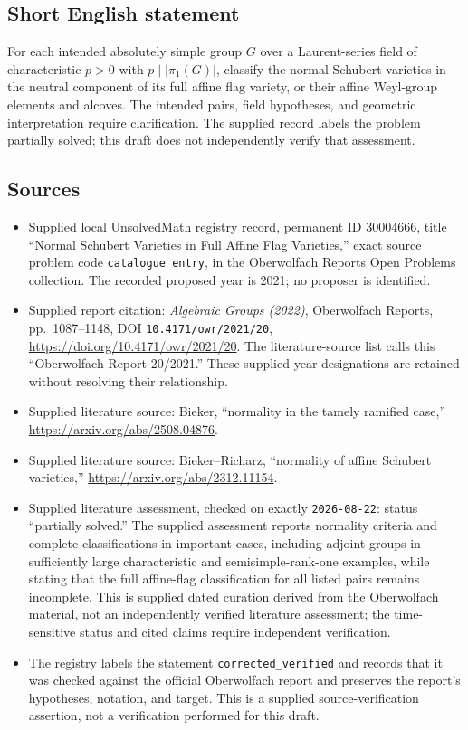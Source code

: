 \documentclass[11pt]{article}
\begin{document}
\subsection{Short English statement}
For each intended absolutely simple group \(G\) over a Laurent-series field of characteristic \(p>0\) with \(p\mid|\pi_1(G)|\), classify the normal Schubert varieties in the neutral component of its full affine flag variety, or their affine Weyl-group elements and alcoves. The intended pairs, field hypotheses, and geometric interpretation require clarification. The supplied record labels the problem partially solved; this draft does not independently verify that assessment.
\subsection{Sources}
\begin{itemize}
\item Supplied local UnsolvedMath registry record, permanent ID \(30004666\), title ``Normal Schubert Varieties in Full Affine Flag Varieties,'' exact source problem code \texttt{catalogue entry}, in the Oberwolfach Reports Open Problems collection. The recorded proposed year is 2021; no proposer is identified.
\item Supplied report citation: \emph{Algebraic Groups (2022)}, Oberwolfach Reports, pp.~1087--1148, DOI \texttt{10.4171/owr/2021/20}, \url{https://doi.org/10.4171/owr/2021/20}. The literature-source list calls this ``Oberwolfach Report 20/2021.'' These supplied year designations are retained without resolving their relationship.
\item Supplied literature source: Bieker, ``normality in the tamely ramified case,'' \url{https://arxiv.org/abs/2508.04876}.
\item Supplied literature source: Bieker--Richarz, ``normality of affine Schubert varieties,'' \url{https://arxiv.org/abs/2312.11154}.
\item Supplied literature assessment, checked on exactly \texttt{2026-08-22}: status ``partially solved.'' The supplied assessment reports normality criteria and complete classifications in important cases, including adjoint groups in sufficiently large characteristic and semisimple-rank-one examples, while stating that the full affine-flag classification for all listed pairs remains incomplete. This is supplied dated curation derived from the Oberwolfach material, not an independently verified literature assessment; the time-sensitive status and cited claims require independent verification.
\item The registry labels the statement \texttt{corrected\_verified} and records that it was checked against the official Oberwolfach report and preserves the report's hypotheses, notation, and target. This is a supplied source-verification assertion, not a verification performed for this draft.
\end{itemize}
\end{document}
